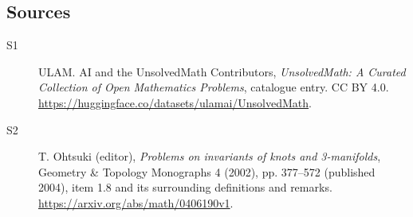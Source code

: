 \documentclass[11pt]{article}
\begin{document}
\subsection{Sources}
\begin{description}
\item[\hypertarget{source:statement:1}{S1}] ULAM. AI and the UnsolvedMath Contributors, \emph{UnsolvedMath: A Curated Collection of Open Mathematics Problems}, catalogue entry. CC BY 4.0. \url{https://huggingface.co/datasets/ulamai/UnsolvedMath}.
\item[\hypertarget{source:statement:2}{S2}] T. Ohtsuki (editor), \emph{Problems on invariants of knots and 3-manifolds}, Geometry \& Topology Monographs 4 (2002), pp. 377--572 (published 2004), item 1.8 and its surrounding definitions and remarks. \url{https://arxiv.org/abs/math/0406190v1}.
\end{description}
\label{end:statement}
\end{document}
